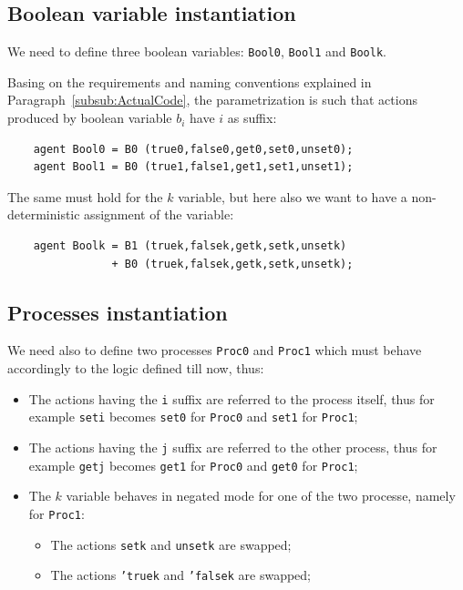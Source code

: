 \documentclass[10pt,a4paper]{article}
\newcommand{\CCSCode}[1]{{\tt #1}}
\newcommand{\Agent}[1]{{\tt {#1}}}
\begin{document}
    \subsection{Boolean variable instantiation}

        We need to define three boolean variables: \Agent{Bool0},
        \Agent{Bool1} and \Agent{Boolk}.

        Basing on the requirements and naming conventions explained in
        Paragraph~\ref{subsub:ActualCode}, the parametrization is such
        that actions produced by boolean variable $b_i$ have $i$ as
        suffix:
        \begin{verbatim}
    agent Bool0 = B0 (true0,false0,get0,set0,unset0);
    agent Bool1 = B0 (true1,false1,get1,set1,unset1);
        \end{verbatim}

        The same must hold for the $k$ variable, but here also we want to
        have a non-deterministic assignment of the variable:
        \begin{verbatim}
    agent Boolk = B1 (truek,falsek,getk,setk,unsetk)
                + B0 (truek,falsek,getk,setk,unsetk);
        \end{verbatim}

    \subsection{Processes instantiation}

        We need also to define two processes \Agent{Proc0} and
        \Agent{Proc1} which must behave accordingly to the logic defined
        till now, thus:
        \begin{itemize}

        \item   The actions having the \CCSCode{i} suffix are referred to
                the process itself, thus for example \CCSCode{seti}
                becomes \CCSCode{set0} for \Agent{Proc0} and
                \CCSCode{set1} for \Agent{Proc1};

        \item   The actions having the \CCSCode{j} suffix are referred to
                the other process, thus for example \CCSCode{getj} becomes
                \CCSCode{get1} for \Agent{Proc0} and \CCSCode{get0} for
                \Agent{Proc1};

        \item   The $k$ variable behaves in negated mode for one of the two
                processe, namely for \Agent{Proc1}:

            \begin{itemize}

            \item   The actions \CCSCode{setk} and \CCSCode{unsetk} are
                    swapped;
            \item   The actions \CCSCode{'truek} and \CCSCode{'falsek} are
                    swapped;

            \end{itemize}

        \end{itemize}
\end{document}
